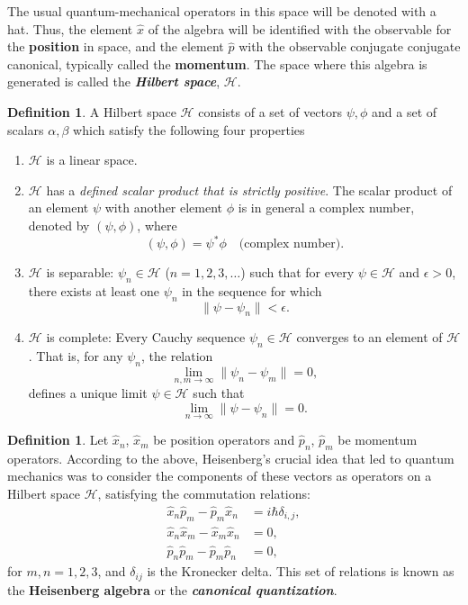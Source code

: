 \documentclass[12pt,a4paper]{article}
\theoremstyle{plain}
\theoremstyle{definition}
\newtheorem{definition}[theorem]{Definition}
\theoremstyle{remark}
\begin{document}
The usual quantum-mechanical operators in this space will be denoted with a hat. Thus, the element \(\hat{x}\) of the algebra will be identified with the observable for the \textbf{ position} in space, and the element \(\hat{p}\) with the observable conjugate conjugate canonical, typically called the \textbf{ momentum}. The space where this algebra is generated is called the \textit{\textbf{Hilbert space}}, $\mathcal{H}$.

\begin{definition}\cite{Zettili2009} A Hilbert space \( \mathcal{H} \) consists of a set of vectors \( \psi, \phi \) and a set of scalars \( \alpha, \beta \) which satisfy the following four properties 
\begin{enumerate}
    \item[(i)]  \( \mathcal{H} \) is a linear space.
    \item[(ii)]  \( \mathcal{H} \) has a \textit{defined scalar product that is strictly positive}. The scalar product of an element \( \psi \) with another element \( \phi \) is in general a complex number, denoted by \( (\psi, \phi) \), where 
    \[
    (\psi, \phi) = \psi^* \phi \quad \text{(complex number)}.
    \]
    \item[(iii)]  \( \mathcal{H} \) is separable: \( \psi_n \in \mathcal{H} \) (\( n = 1,2,3, \dots \)) such that for every \( \psi \in \mathcal{H} \) and \( \epsilon > 0 \), there exists at least one \( \psi_n \) in the sequence for which 
    \[
    \|\psi - \psi_n\| < \epsilon.
    \]
    \item[(iv)]  \( \mathcal{H} \) is complete: Every Cauchy sequence \( \psi_n \in \mathcal{H} \) converges to an element of \( \mathcal{H} \). That is, for any \( \psi_n \), the relation
    \[
    \lim_{n,m \to \infty} \|\psi_n - \psi_m\| = 0,
    \]
    defines a unique limit \( \psi \in \mathcal{H} \) such that 
    \[
    \lim_{n \to \infty} \|\psi - \psi_n\| = 0.
    \]
\end{enumerate}  
\end{definition}

\begin{definition}\cite{Heisenberg1925, Dirac1925}\label{classic-Heis}
Let \(\hat{x}_{n}\), \(\hat{x}_{m}\) be position operators and \(\hat{p}_{n}\), \(\hat{p}_{m}\) be momentum operators. According to the above, Heisenberg's crucial idea that led to quantum mechanics was to consider the components of these vectors as operators on a Hilbert space \(\mathcal{H}\), satisfying the commutation relations:
\begin{align}
   \label{Heis-1}\hat{x}_{n}\hat{p}_{m} - \hat{p}_{m}\hat{x}_{n} &= i\hbar\delta_{i,j}, \\ 
   \label{Heis-2}\hat{x}_{n}\hat{x}_{m} - \hat{x}_{m}\hat{x}_{n} &= 0, \\ 
   \label{Heis-3}\hat{p}_{n}\hat{p}_{m} - \hat{p}_{m}\hat{p}_{n} &= 0,
\end{align}
for \(m, n = 1, 2, 3\),  and \(\delta_{ij}\) is the Kronecker delta. This set of relations is known as the \textbf{Heisenberg algebra} or the \textit{\textbf{canonical quantization}}.
\end{definition}
\end{document}
